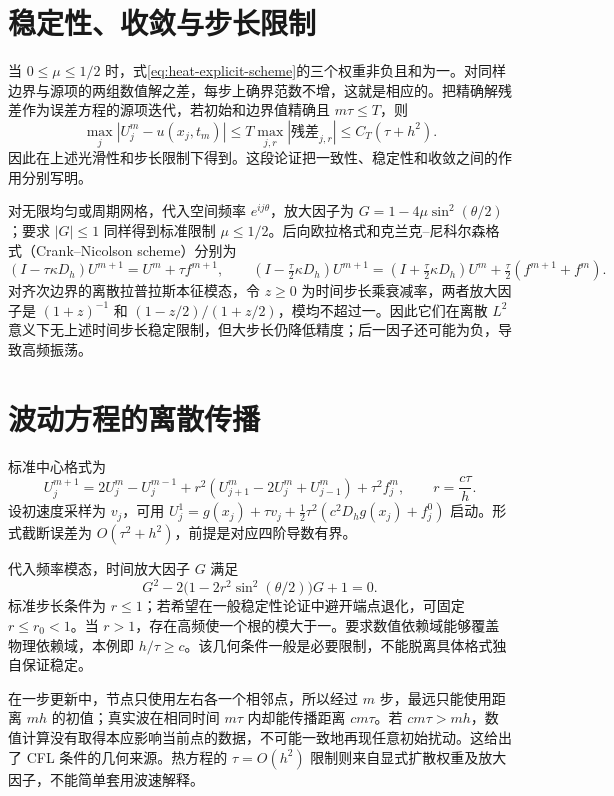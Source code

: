 \documentclass[UTF8,12pt,a4paper,fontset=fandol]{ctexbook}
\begin{document}
\section{稳定性、收敛与步长限制}
当 $0\le\mu\le1/2$ 时，式\eqref{eq:heat-explicit-scheme}的三个权重非负且和为一。对同样边界与源项的两组数值解之差，每步上确界范数不增，这就是相应的。把精确解残差作为误差方程的源项迭代，若初始和边界值精确且 $m\tau\le T$，则
\[
 \max_j|U_j^m-u(x_j,t_m)|\le T\max_{j,r}|\text{残差}_{j,r}|
 \le C_T(\tau+h^2).
\]
因此在上述光滑性和步长限制下得到。这段论证把一致性、稳定性和收敛之间的作用分别写明。

对无限均匀或周期网格，代入空间频率 $e^{ij\theta}$，放大因子为 $G=1-4\mu\sin^2(\theta/2)$；要求 $|G|\le1$ 同样得到标准限制 $\mu\le1/2$。后向欧拉格式和克兰克--尼科尔森格式（Crank--Nicolson scheme）分别为
\[
 (I-\tau\kappa D_h)U^{m+1}=U^m+\tau f^{m+1},\qquad
 (I-\tfrac\tau2\kappa D_h)U^{m+1}=(I+\tfrac\tau2\kappa D_h)U^m+\tfrac\tau2(f^{m+1}+f^m).
\]
对齐次边界的离散拉普拉斯本征模态，令 $z\ge0$ 为时间步长乘衰减率，两者放大因子是 $(1+z)^{-1}$ 和 $(1-z/2)/(1+z/2)$，模均不超过一。因此它们在离散 $L^2$ 意义下无上述时间步长稳定限制，但大步长仍降低精度；后一因子还可能为负，导致高频振荡。

\section{波动方程的离散传播}
标准中心格式为
\[
 U_j^{m+1}=2U_j^m-U_j^{m-1}+
 r^2(U_{j+1}^m-2U_j^m+U_{j-1}^m)+\tau^2 f_j^m,
 \qquad r=\frac{c\tau}{h}.
\]
设初速度采样为 $v_j$，可用 $U_j^1=g(x_j)+\tau v_j+\frac12\tau^2(c^2D_hg(x_j)+f_j^0)$ 启动。形式截断误差为 $O(\tau^2+h^2)$，前提是对应四阶导数有界。

代入频率模态，时间放大因子 $G$ 满足
\[
 G^2-2\bigl(1-2r^2\sin^2(\theta/2)\bigr)G+1=0.
\]
标准步长条件为 $r\le1$；若希望在一般稳定性论证中避开端点退化，可固定 $r\le r_0<1$。当 $r>1$，存在高频使一个根的模大于一。要求数值依赖域能够覆盖物理依赖域，本例即 $h/\tau\ge c$。该几何条件一般是必要限制，不能脱离具体格式独自保证稳定。

在一步更新中，节点只使用左右各一个相邻点，所以经过 $m$ 步，最远只能使用距离 $mh$ 的初值；真实波在相同时间 $m\tau$ 内却能传播距离 $cm\tau$。若 $cm\tau>mh$，数值计算没有取得本应影响当前点的数据，不可能一致地再现任意初始扰动。这给出了 CFL 条件的几何来源。热方程的 $\tau=O(h^2)$ 限制则来自显式扩散权重及放大因子，不能简单套用波速解释。
\end{document}
